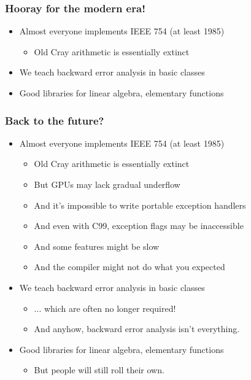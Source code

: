 \documentclass{beamer}
\begin{document}
\begin{frame}[fragile]
  \frametitle{Hooray for the modern era!}

  \begin{itemize}
  \item Almost everyone implements IEEE 754 (at least 1985)
    \begin{itemize}
    \item Old Cray arithmetic is essentially extinct
    \end{itemize}
  \item We teach backward error analysis in basic classes
  \item Good libraries for linear algebra, 
        elementary functions
  \end{itemize}
\end{frame}


\begin{frame}[fragile]
  \frametitle{Back to the future?}

  \begin{itemize}
  \item Almost everyone implements IEEE 754 (at least 1985)
    \begin{itemize}
    \item Old Cray arithmetic is essentially extinct
    \item But GPUs may lack gradual underflow
    \item And it's impossible to write portable exception handlers
    \item And even with C99, exception flags may be inaccessible
    \item And some features might be slow 
    \item And the compiler might not do what you expected
    \end{itemize}
  \item We teach backward error analysis in basic classes
    \begin{itemize}
    \item ... which are often no longer required!
    \item And anyhow, backward error analysis isn't everything.
    \end{itemize}
  \item Good libraries for linear algebra, 
        elementary functions
    \begin{itemize}
    \item But people will still roll their own.
    \end{itemize}
  \end{itemize}

\end{frame}
\end{document}
